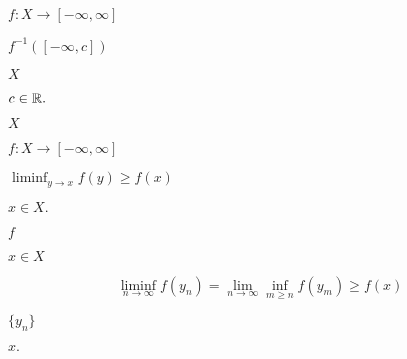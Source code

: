 \documentclass[10pt]{book}
\begin{document}
\begin{mdSnippets}
\begin{mdInlineSnippet}[9c3729f1b2ef77b97bbdb1135d803c69]
$f: X \to [-\infty, \infty]$\end{mdInlineSnippet}%
\begin{mdInlineSnippet}[2e76e87b3447a2eda956d861af860dd2]%
$f^{-1}([-\infty, c])$\end{mdInlineSnippet}%
\begin{mdInlineSnippet}[02129bb861061d1a052c592e2dc6b383]%
$X$\end{mdInlineSnippet}%
\begin{mdInlineSnippet}%
$c \in \mathbb{R}.$\end{mdInlineSnippet}%
\begin{mdInlineSnippet}[02129bb861061d1a052c592e2dc6b383]%
$X$\end{mdInlineSnippet}%
\begin{mdInlineSnippet}[9c3729f1b2ef77b97bbdb1135d803c69]%
$f: X \to [-\infty, \infty]$\end{mdInlineSnippet}%
\begin{mdInlineSnippet}%
$\displaystyle \liminf_{y \to x} f(y) \ge f(x)$\end{mdInlineSnippet}%
\begin{mdInlineSnippet}[94a3ac7461d7486024cf3d570269399e]%
$x \in X.$\end{mdInlineSnippet}%
\begin{mdInlineSnippet}%
$f$\end{mdInlineSnippet}%
\begin{mdInlineSnippet}[4202025ca33a0244467654fcec511b07]%
$x \in X$\end{mdInlineSnippet}%
\begin{mdDisplaySnippet}[b410872062e9099f66c7aa1e26cc3706]%
\[%
\liminf_{n \to \infty} f(y_n) = \lim_{n \to \infty} \inf_{m \ge n} f(y_m) \ge f(x)
\]%
\end{mdDisplaySnippet}%
\begin{mdInlineSnippet}%
$\{y_n\}$\end{mdInlineSnippet}%
\begin{mdInlineSnippet}[fd3500a59568ee1c126a5e50c6bc8b91]%
$x.$\end{mdInlineSnippet}%

\end{mdSnippets}
\end{document}
